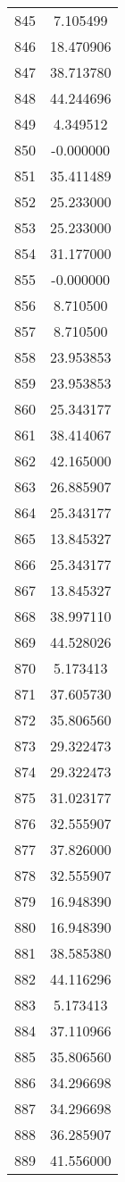 \documentclass[12pt]{article}
\begin{document}
\begin{longtable}{@{}cc@{}}
845 & 7.105499 \\
846 & 18.470906 \\
847 & 38.713780 \\
848 & 44.244696 \\
849 & 4.349512 \\
850 & -0.000000 \\
851 & 35.411489 \\
852 & 25.233000 \\
853 & 25.233000 \\
854 & 31.177000 \\
855 & -0.000000 \\
856 & 8.710500 \\
857 & 8.710500 \\
858 & 23.953853 \\
859 & 23.953853 \\
860 & 25.343177 \\
861 & 38.414067 \\
862 & 42.165000 \\
863 & 26.885907 \\
864 & 25.343177 \\
865 & 13.845327 \\
866 & 25.343177 \\
867 & 13.845327 \\
868 & 38.997110 \\
869 & 44.528026 \\
870 & 5.173413 \\
871 & 37.605730 \\
872 & 35.806560 \\
873 & 29.322473 \\
874 & 29.322473 \\
875 & 31.023177 \\
876 & 32.555907 \\
877 & 37.826000 \\
878 & 32.555907 \\
879 & 16.948390 \\
880 & 16.948390 \\
881 & 38.585380 \\
882 & 44.116296 \\
883 & 5.173413 \\
884 & 37.110966 \\
885 & 35.806560 \\
886 & 34.296698 \\
887 & 34.296698 \\
888 & 36.285907 \\
889 & 41.556000 \\

\end{longtable}
\end{document}
